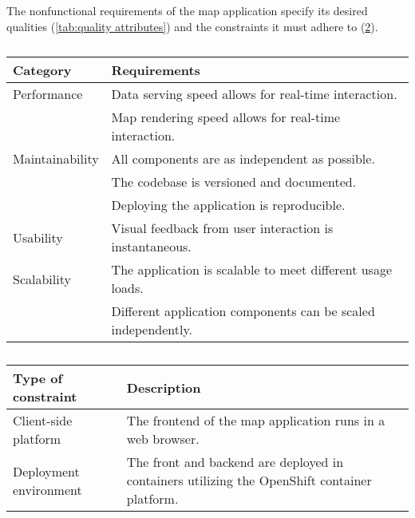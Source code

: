 \begin{table}[H]
	\caption{
		The nonfunctional requirements of the map application specify
		its desired qualities (\ref{tab:quality attributes}) and
		the constraints it must adhere to (\ref{tab:constraints}).
	}
	\label{tab:nonfunctional requirements}
	\begin{subtable}[h]{\textwidth}
		\caption{}
		\label{tab:quality attributes}
		\centering
		\begin{tabular}{ | L{0.2\textwidth} | L{0.7\textwidth} | }
			\hline
			\textbf{Category}
			& \textbf{Requirements}
			\\
			\hline
			\hline
			Performance
			& \tabitem Data serving speed allows for real-time interaction. \\
			& \tabitem Map rendering speed allows for real-time interaction. \\
			\hline
			Maintainability
			& \tabitem All components are as independent as possible. \\
			& \tabitem The codebase is versioned and documented. \\
			& \tabitem Deploying the application is reproducible. \\
			\hline
			Usability
			& \tabitem Visual feedback from user interaction is instantaneous. \\
			\hline
			Scalability
			& \tabitem The application is scalable to meet different usage loads. \\
			& \tabitem Different application components can be scaled independently. \\
			\hline
		\end{tabular}
	\end{subtable}
	\newline
	\newline  %
	\newline
	\begin{subtable}[h]{\textwidth}
		\caption{}
		\label{tab:constraints}
		\centering
		\begin{tabular}{ | L{0.2\textwidth} | L{0.7\textwidth} | }
			\hline
			\textbf{Type of constraint}
			& \textbf{Description}
			\\
			\hline
			\hline
			Client-side platform
			& The frontend of the map application runs in a web browser.
			\\
			\hline
			Deployment environment
			& The front and backend are deployed in containers
			utilizing the OpenShift container platform.
			\\
			\hline
		\end{tabular}
	\end{subtable}
\end{table}
